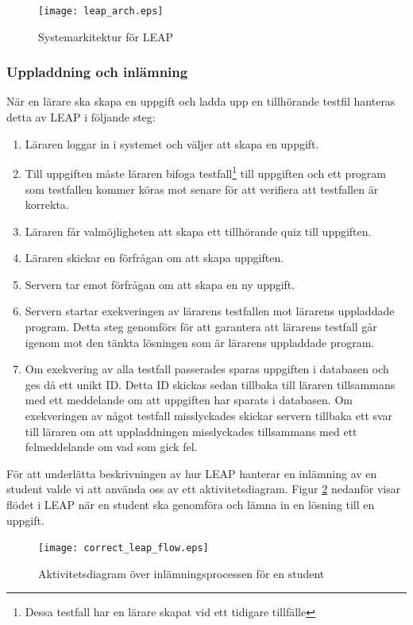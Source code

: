 \documentclass[a4paper,11pt]{article}
\begin{document}
{\begin{figure}[ht!]
\centering
\texttt{[image: leap\_arch.eps]}
\caption{Systemarkitektur för LEAP}
\label{fig:LeapArch}
\end{figure}

\newpage
\subsubsection{Uppladdning och inlämning}

När en lärare ska skapa en uppgift och ladda upp en tillhörande testfil hanteras detta av LEAP i följande steg: 
\begin{enumerate}
\item
Läraren loggar in i systemet och väljer att skapa en uppgift.
\item
Till uppgiften måste läraren bifoga testfall\footnote{Dessa testfall har en lärare skapat vid ett tidigare tillfälle} till uppgiften och ett program som testfallen kommer köras mot senare för att verifiera att testfallen är korrekta.
\item
Läraren får valmöjligheten att skapa ett tillhörande quiz till uppgiften.
\item
Läraren skickar en förfrågan om att skapa uppgiften.
\item
Servern tar emot förfrågan om att skapa en ny uppgift.
\item
Servern startar exekveringen av lärarens testfallen mot lärarens uppladdade program. Detta steg genomförs för att garantera att lärarens testfall går igenom mot den tänkta lösningen som är lärarens uppladdade program.
\item
Om exekvering av alla testfall passerades sparas uppgiften i databasen och ges då ett unikt ID. Detta ID skickas sedan tillbaka till läraren tillsammans med ett meddelande om att uppgiften har sparats i databasen. Om exekveringen av något testfall misslyckades skickar servern tillbaka ett svar till läraren om att uppladdningen misslyckades tillsammans med ett felmeddelande om vad som gick fel.
\end{enumerate}

\newpage

För att underlätta beskrivningen av hur LEAP hanterar en inlämning av en student valde vi att använda oss av ett aktivitetsdiagram. Figur \ref{fig:LeapFlow} nedanför visar flödet i LEAP när en student ska genomföra och lämna in en lösning till en uppgift.

\begin{figure}[ht!]
\centering
\texttt{[image: correct\_leap\_flow.eps]}
\caption{Aktivitetsdiagram över inlämningsprocessen för en student}
\label{fig:LeapFlow}
\end{figure}

}
\end{document}
